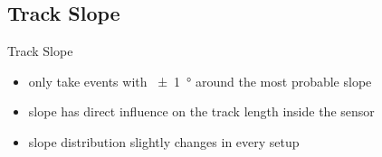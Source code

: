 \subsection{Track Slope}
\begin{frame}{Track Slope}
	
	
	\begin{itemize}\itemfill
		\item only take events with \SI{\pm1}{\degree} around the most probable slope
		\item slope has direct influence on the track length inside the sensor
		\item slope distribution slightly changes in every setup 
	\end{itemize}
 
\end{frame}

